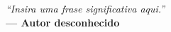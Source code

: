 
\renewcommand{\epigraphname}{EPÍGRAFE}

\begin{epigrafe}

    \textit{``Insira uma frase significativa aqui.''}\\
    \textbf{— Autor desconhecido}

\end{epigrafe}

